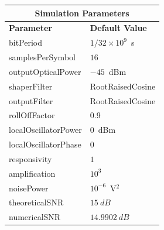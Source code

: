\begin{refsection}
\begin{table}[H]
	\begin{tabular}{|l|l|}
		\hline
		\multicolumn{2}{|c|}{ \textbf{Simulation Parameters} } \\
		\hline
		\textbf{Parameter}     & \textbf{Default Value}                                     \\\hline
		bitPeriod              & $1/32\times10^9$~s														\\\hline
		samplesPerSymbol       & $16$                                                       \\\hline
		outputOpticalPower     & $-45$~dBm 													\\ \hline
		shaperFilter	       & RootRaisedCosine												\\ \hline
		outputFilter		   & RootRaisedCosine												\\ \hline
		rollOffFactor		   & 0.9														\\ \hline
		localOscillatorPower   & $0$~dBm                                                    \\ \hline
		localOscillatorPhase   & $0$                                                        \\ \hline
		responsivity           & $1$                                                        \\ \hline
		amplification          & $10^3$                                                     \\ \hline
		noisePower   & $10^{-6}$~V$^2$                             					\\ \hline
		theoreticalSNR  	   & $15~dB$                             					\\ \hline
		numericalSNR 		     & $14.9902~dB$                             					\\ \hline

\end{tabular}
\end{table}
\end{refsection}
